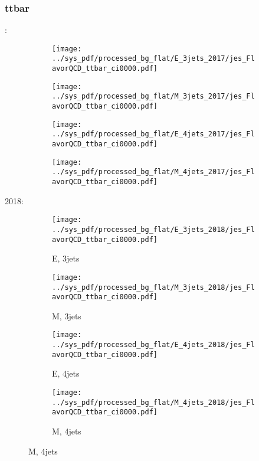 \documentclass{beamer}
\begin{document}
\begin{frame}
\frametitle{ttbar}
\fontsize{5}{1}:
\begin{figure}
\centering
\begin{subfigure}[b]{0.24\textwidth}
\texttt{[image: ../sys\_pdf/processed\_bg\_flat/E\_3jets\_2017/jes\_FlavorQCD\_ttbar\_ci0000.pdf]}
\end{subfigure}
\begin{subfigure}[b]{0.24\textwidth}
\texttt{[image: ../sys\_pdf/processed\_bg\_flat/M\_3jets\_2017/jes\_FlavorQCD\_ttbar\_ci0000.pdf]}
\end{subfigure}
\begin{subfigure}[b]{0.24\textwidth}
\texttt{[image: ../sys\_pdf/processed\_bg\_flat/E\_4jets\_2017/jes\_FlavorQCD\_ttbar\_ci0000.pdf]}
\end{subfigure}
\begin{subfigure}[b]{0.24\textwidth}
\texttt{[image: ../sys\_pdf/processed\_bg\_flat/M\_4jets\_2017/jes\_FlavorQCD\_ttbar\_ci0000.pdf]}
\end{subfigure}
\end{figure}
2018:
\begin{figure}
\centering
\begin{subfigure}[b]{0.24\textwidth}
\texttt{[image: ../sys\_pdf/processed\_bg\_flat/E\_3jets\_2018/jes\_FlavorQCD\_ttbar\_ci0000.pdf]}
\captionsetup{font=tiny}
\caption{E, 3jets}
\end{subfigure}
\begin{subfigure}[b]{0.24\textwidth}
\texttt{[image: ../sys\_pdf/processed\_bg\_flat/M\_3jets\_2018/jes\_FlavorQCD\_ttbar\_ci0000.pdf]}
\captionsetup{font=tiny}
\caption{M, 3jets}
\end{subfigure}
\begin{subfigure}[b]{0.24\textwidth}
\texttt{[image: ../sys\_pdf/processed\_bg\_flat/E\_4jets\_2018/jes\_FlavorQCD\_ttbar\_ci0000.pdf]}
\captionsetup{font=tiny}
\caption{E, 4jets}
\end{subfigure}
\begin{subfigure}[b]{0.24\textwidth}
\texttt{[image: ../sys\_pdf/processed\_bg\_flat/M\_4jets\_2018/jes\_FlavorQCD\_ttbar\_ci0000.pdf]}
\captionsetup{font=tiny}
\caption{M, 4jets}
\end{subfigure}
\end{figure}
\end{frame}
\end{document}
